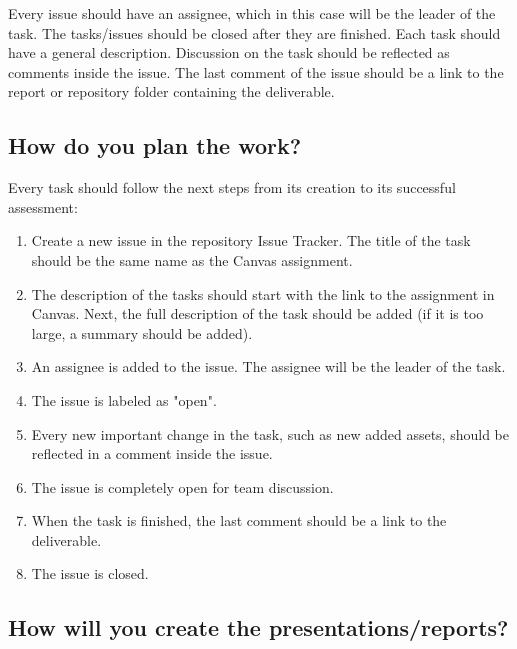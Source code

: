 \documentclass{article}
\begin{document}
Every issue should have an assignee, which in this case will be the leader of the task. The tasks/issues should be closed after they are finished. Each task should have a general description. Discussion on the task should be reflected as comments inside the issue. The last comment of the issue should be a link to the report or repository folder containing the deliverable.


\subsection{How do you plan the work?}

Every task should follow the next steps from its creation to its successful assessment:

\begin{enumerate}
    \item Create a new issue in the repository Issue Tracker. The title of the task should be the same name as the Canvas assignment.
    \item The description of the tasks should start with the link to the assignment in Canvas. Next, the full description of the task should be added (if it is too large, a summary should be added).
    \item An assignee is added to the issue. The assignee will be the leader of the task.
    \item The issue is labeled as "open".
    \item Every new important change in the task, such as new added assets, should be reflected in a comment inside the issue. 
    \item The issue is completely open for team discussion.
    \item When the task is finished, the last comment should be a link to the deliverable.
    \item The issue is closed.
\end{enumerate}

    

\subsection{How will you create the presentations/reports?}
\end{document}
